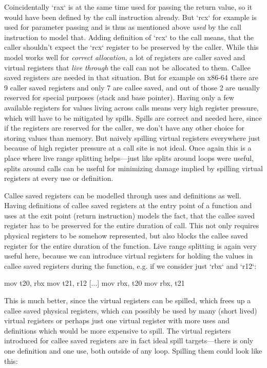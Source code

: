 Coincidentally `rax` is at the same time used for passing the return value, so
it would have been defined by the call instruction already. But `rcx` for
example is used for parameter passing and is thus as mentioned above {\em used}
by the call instruction to model that. Adding definition of `rcx` to the call
means, that the caller shouldn't expect the `rcx` register to be preserved by
the caller. While this model works well for {\em correct allocation}, a lot of
registers are caller saved and virtual registers that {\em live through} the
call can not be allocated to them. Callee saved registers are needed in that
situation. But for example on x86-64 there are 9 caller saved registers and only
7 are callee saved, and out of those 2 are usually reserved for special purposes
(stack and base pointer). Having only a few available registers for values
living across calls means very high register pressure, which will have to be
mitigated by spills. Spills are correct and needed here, since if the registers
are reserved for the caller, we don't have any other choice for storing values
than memory. But naively spilling virtual registers everywhere just because of
high register pressure at a call site is not ideal. Once again this is a place
where live range splitting helps---just like splits around loops were useful,
splits around calls can be useful for minimizing damage implied by spilling
virtual registers at every use or definition.

Callee saved registers can be modelled through uses and definitions as well.
Having definitions of callee saved registers at the entry point of a function
and uses at the exit point (return instruction) models the fact, that the callee
saved register has to be preserved for the entire duration of call. This not
only requires physical registers to be somehow represented, but also blocks the
callee saved register for the entire duration of the function. Live range
splitting is again very useful here, because we can introduce virtual registers
for holding the values in callee saved registers during the function, e.g. if we
consider just `rbx` and `r12`:

\begtt
mov t20, rbx
mov t21, r12
[...]
mov rbx, t20
mov rbx, t21
\endtt

This is much better, since the virtual registers can be spilled, which frees up
a callee saved physical registers, which can possibly be used by many (short
lived) virtual registers or perhaps just one virtual register with more uses and
definitions which would be more expensive to spill. The virtual
registers introduced for callee saved registers are in fact ideal spill
targets---there is only one definition and one use, both outside of any loop.
Spilling them could look like this:

